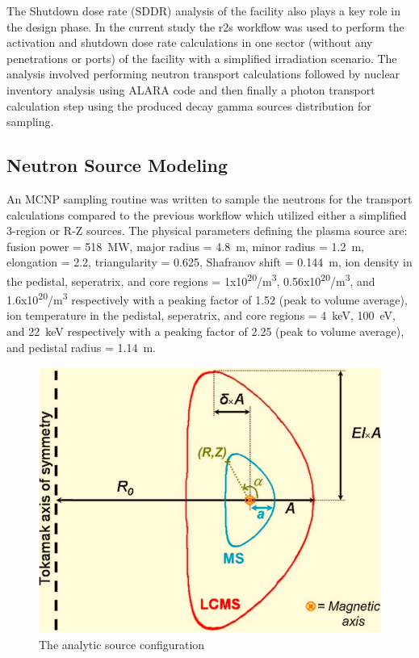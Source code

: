 \documentclass[12pt, letterpaper]{elsarticle}
\begin{document}
The Shutdown dose rate (SDDR) analysis of the facility also plays a key role in the design phase. In the current study the r2s \cite{ref_8} workflow was used to perform the activation and shutdown dose rate calculations in one sector (without any penetrations or ports) of the facility with a simplified irradiation scenario. The analysis involved performing neutron transport calculations followed by nuclear inventory analysis using ALARA \cite{ref_9} code and then finally a photon transport calculation step using the produced decay gamma sources distribution for sampling.    

\subsection{Neutron Source Modeling} \label{Neutron Source Modelling}
An MCNP sampling routine was written to sample the neutrons for the transport calculations compared to the previous workflow which utilized either a simplified 3-region or R-Z sources. The physical parameters defining the plasma source \cite{ref_3} are: fusion power = \SI{518}{MW}, major radius = \SI{4.8}{m}, minor radius = \SI{1.2}{m}, elongation = 2.2, triangularity = 0.625, Shafranov shift = \SI{0.144}{m}, ion density in the pedistal, seperatrix, and core regions = 1x10\textsuperscript{20}/m\textsuperscript{3}, 0.56x10\textsuperscript{20}/m\textsuperscript{3}, and 1.6x10\textsuperscript{20}/m\textsuperscript{3} respectively with a peaking factor of 1.52 (peak to volume average), ion temperature in the pedistal, seperatrix, and core regions  = \SI{4}{keV}, \SI{100}{eV}, and \SI{22}{keV} respectively with a peaking factor of 2.25 (peak to volume average), and pedistal radius = \SI{1.14}{m}.
\begin{figure}[h!]
  \centering
  \includegraphics[scale=0.2]{../plots/Analytic_source.png}
  \caption{The analytic source configuration}
  \label{fig:Analytic_source}
\end{figure}
\end{document}

